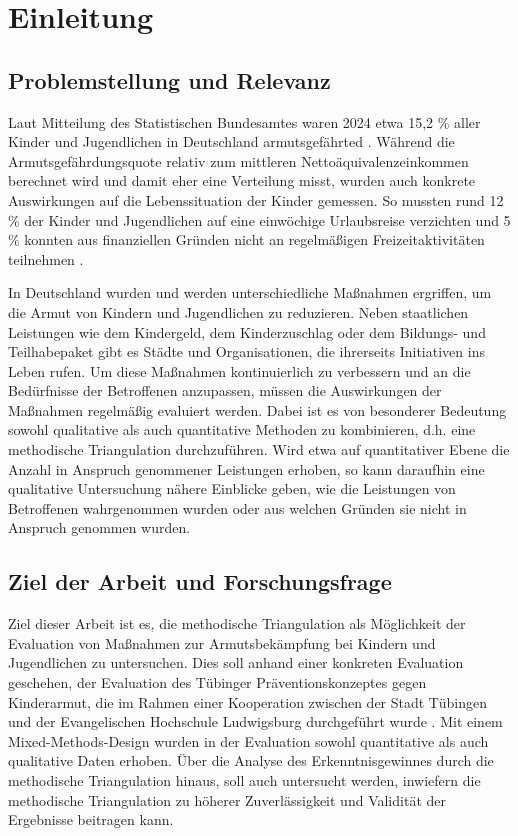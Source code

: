 \section{Einleitung}

\subsection{Problemstellung und Relevanz}

Laut Mitteilung des Statistischen Bundesamtes waren 2024 etwa 15,2 \% aller Kinder und Jugendlichen in Deutschland armutsgefährted \parencite{destatis2025}. Während die Armutsgefährdungsquote relativ zum mittleren Nettoäquivalenzeinkommen berechnet wird und damit eher eine Verteilung misst, wurden auch konkrete Auswirkungen auf die Lebenssituation der Kinder gemessen. So mussten rund 12 \% der Kinder und Jugendlichen auf eine einwöchige Urlaubsreise verzichten und 5 \% konnten aus finanziellen Gründen nicht an regelmäßigen Freizeitaktivitäten teilnehmen \parencite{destatis2025}.

In Deutschland wurden und werden unterschiedliche Maßnahmen ergriffen, um die Armut von Kindern und Jugendlichen zu reduzieren. Neben staatlichen Leistungen wie dem Kindergeld, dem Kinderzuschlag oder dem Bildungs- und Teilhabepaket gibt es Städte und Organisationen, die ihrerseits Initiativen ins Leben rufen. Um diese Maßnahmen kontinuierlich zu verbessern und an die Bedürfnisse der Betroffenen anzupassen, müssen die Auswirkungen der Maßnahmen regelmäßig evaluiert werden. Dabei ist es von besonderer Bedeutung sowohl qualitative als auch quantitative Methoden zu kombinieren, d.h. eine methodische Triangulation durchzuführen. Wird etwa auf quantitativer Ebene die Anzahl in Anspruch genommener Leistungen erhoben, so kann daraufhin eine qualitative Untersuchung nähere Einblicke geben, wie die Leistungen von Betroffenen wahrgenommen wurden oder aus welchen Gründen sie nicht in Anspruch genommen wurden.

\subsection{Ziel der Arbeit und Forschungsfrage}

Ziel dieser Arbeit ist es, die methodische Triangulation als Möglichkeit der Evaluation von Maßnahmen zur Armutsbekämpfung bei Kindern und Jugendlichen zu untersuchen. Dies soll anhand einer konkreten Evaluation geschehen, der Evaluation des Tübinger Präventionskonzeptes gegen Kinderarmut, die im Rahmen einer Kooperation zwischen der Stadt Tübingen und der Evangelischen Hochschule Ludwigsburg durchgeführt wurde \parencite{tuebingen2024}. Mit einem Mixed-Methods-Design wurden in der Evaluation sowohl quantitative als auch qualitative Daten erhoben. Über die Analyse des Erkenntnisgewinnes durch die methodische Triangulation hinaus, soll auch untersucht werden, inwiefern die methodische Triangulation zu höherer Zuverlässigkeit und Validität der Ergebnisse beitragen kann.

